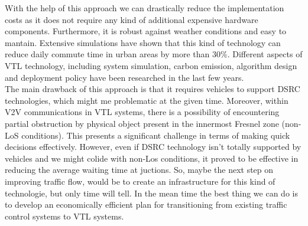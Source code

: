 \documentclass[17pt]{report}
\begin{document}
\indent \indent
With the help of this approach we can drastically reduce
the implementation costs as it does not require any kind of additional
expensive hardware components. Furthermore, it is robust against weather conditions
and easy to mantain. Extensive simulations have shown that this kind
of technology can reduce daily commute time in urban areas by more than 30\%.
Different aspects of VTL technology, including system simulation, carbon
emission, algorithm design and deployment policy have been researched in the
last few years. \cite{Neudecker2012}\\
\indent \indent
The main drawback of this approach is that it requires vehicles
to support DSRC technologies, which might me problematic at the given time.
Moreover, within V2V communications in VTL systems, there is a possibility of
encountering partial obstruction by physical object present in the innermost
Fresnel zone (non-LoS conditions). This presents a significant challenge in terms
of making quick decisions effectively. However, even if DSRC
technology isn't totally supported by vehicles and we might colide with non-Los
conditions, it proved to be effective in reducing the average waiting time at
juctions. So, maybe the next step on improving traffic flow, would be to create
an infrastructure for this kind of technologie, but only time will tell. In the mean
time the best thing we can do is to develop an economically efficient plan for
transitioning from existing traffic control systems to  VTL systems.

\pagebreak
\end{document}
